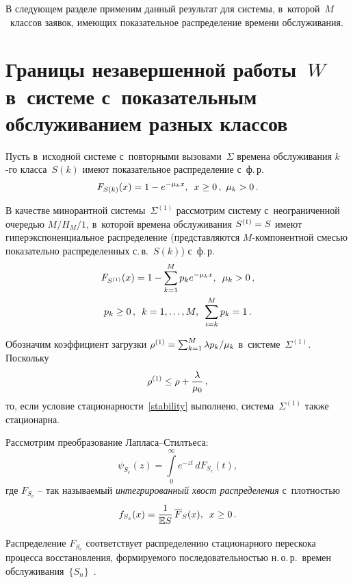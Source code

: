 \begin{multicols}{2}
\smallskip

В следующем разделе применим данный результат для сис\-те\-мы, в~которой~$M$~классов 
заявок, име\-ющих  показательное распределение времени обслуживания.

\section{Границы незавершенной работы~$W$ в~системе с~показательным 
обслуживанием разных классов }

Пусть в~исходной сис\-те\-ме с~повторными вызовами~$\Sigma$ времена обслуживания 
$k$-го класса~$S(k)$ имеют показательное распределение с~ф.\,р.
\begin{equation}
\label{hyperexp}
F_{S(k)}(x)= 1- e^{-\mu_k x}, \enskip x\ge 0\,, \ \mu_k >0\,.
\end{equation}

В качестве минорантной сис\-те\-мы~$\Sigma^{(1)}$ рассмотрим сис\-те\-му 
с~неограниченной  очередью  $M/H_M/1$, в~которой времена обслуживания $S^{(1)}\hm=S$ 
имеют гиперэкспоненциальное распределение (пред\-став\-ля\-ют\-ся $M$-ком\-по\-нент\-ной 
смесью показательно распределенных с.\,в.~$S(k)$) с~ф.\,р.
\begin{multline*}
F_{S^{(1)}}(x) = 1 -  \sum\limits_{k=1}^M p_k e^{-\mu_k x}, \enskip \mu_k > 0\,, \\ 
p_k\ge 0\,,\enskip k=1,\ldots,M, \enskip \sum\limits_{i=k}^M p_k=1\,.
\end{multline*}

Обозначим коэффициент загрузки  $\rho^{(1)} \hm=\sum\nolimits_{k=1}^M \lambda 
p_k/\mu_k$ в~сис\-те\-ме~$\Sigma^{(1)}$. Поскольку
$$
\rho^{(1)} \le \rho + \displaystyle\frac{\displaystyle \lambda\mathstrut}{\displaystyle \mu_0 \mathstrut}\,,
$$
то, если условие стационарности~\eqref{stability} выполнено,    сис\-те\-ма~$\Sigma^{(1)}$ также стационарна.

Рассмотрим преобразование Лап\-ла\-са--Стилть\-еса:
\begin{equation*}
 \psi_{S_e}(z)=\int\limits_0^\infty e^{-zt} \,dF_{S_e}(t),
\end{equation*}
где $F_{S_e}$ -- так называемый \textit{интегрированный хвост
распределения} с~плот\-ностью
\begin{equation*}
f_{S_e}(x)=\displaystyle\frac{\displaystyle 1\mathstrut}{\displaystyle \mathbb{E} S\mathstrut}\, \overline F_S(x),\enskip x\ge0\,.
\end{equation*}

Распределение $F_{S_e}$ соответствует распределению стационарного перескока 
процесса вос\-ста\-нов\-ле\-ния, фор\-ми\-ру\-емо\-го по\-сле\-до\-ва\-тель\-ностью н.\,о.\,р.\ времен 
обслуживания~$\{S_n\}$~\cite{Asmus}.


\end{multicols}
